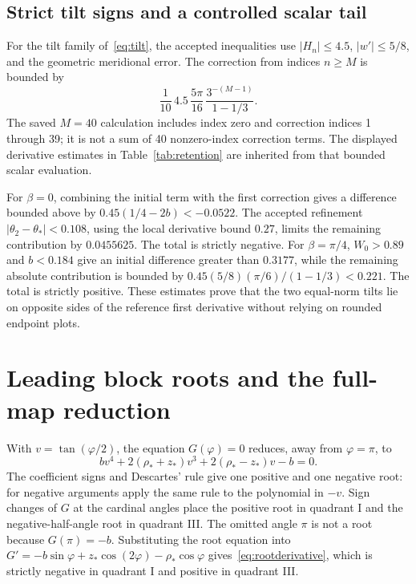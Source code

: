 \documentclass[11pt,a4paper]{article}
\numberwithin{equation}{section}
\begin{document}
\subsection{Strict tilt signs and a controlled scalar tail}
For the tilt family of~\eqref{eq:tilt}, the accepted inequalities use $|H_n|\le4.5$, $|w'|\le5/8$, and the geometric meridional error. The correction from indices $n\ge M$ is bounded by
\begin{equation}\label{eq:tilttail}
\frac1{10}\,4.5\,\frac{5\pi}{16}\,
\frac{3^{-(M-1)}}{1-1/3}.
\end{equation}
The saved $M=40$ calculation includes index zero and correction indices 1 through 39; it is not a sum of 40 nonzero-index correction terms. The displayed derivative estimates in Table~\ref{tab:retention} are inherited from that bounded scalar evaluation.

For $\beta=0$, combining the initial term with the first correction gives a difference bounded above by $0.45(1/4-2b)<-0.0522$. The accepted refinement $|\theta_2-\theta_*|<0.108$, using the local derivative bound $0.27$, limits the remaining contribution by $0.0455625$. The total is strictly negative. For $\beta=\pi/4$, $W_0>0.89$ and $b<0.184$ give an initial difference greater than $0.3177$, while the remaining absolute contribution is bounded by $0.45(5/8)(\pi/6)/(1-1/3)<0.221$. The total is strictly positive. These estimates prove that the two equal-norm tilts lie on opposite sides of the reference first derivative without relying on rounded endpoint plots.

\section{Leading block roots and the full-map reduction}\label{app:block}
With $v=\tan(\varphi/2)$, the equation $G(\varphi)=0$ reduces, away from $\varphi=\pi$, to
\begin{equation}\label{eq:quartic}
bv^4+2(\rho_*+z_*)v^3+2(\rho_*-z_*)v-b=0.
\end{equation}
The coefficient signs and Descartes' rule give one positive and one negative root: for negative arguments apply the same rule to the polynomial in $-v$. Sign changes of $G$ at the cardinal angles place the positive root in quadrant I and the negative-half-angle root in quadrant III. The omitted angle $\pi$ is not a root because $G(\pi)=-b$. Substituting the root equation into $G'=-b\sin\varphi+z_*\cos(2\varphi)-\rho_*\cos\varphi$ gives~\eqref{eq:rootderivative}, which is strictly negative in quadrant I and positive in quadrant III.
\end{document}
